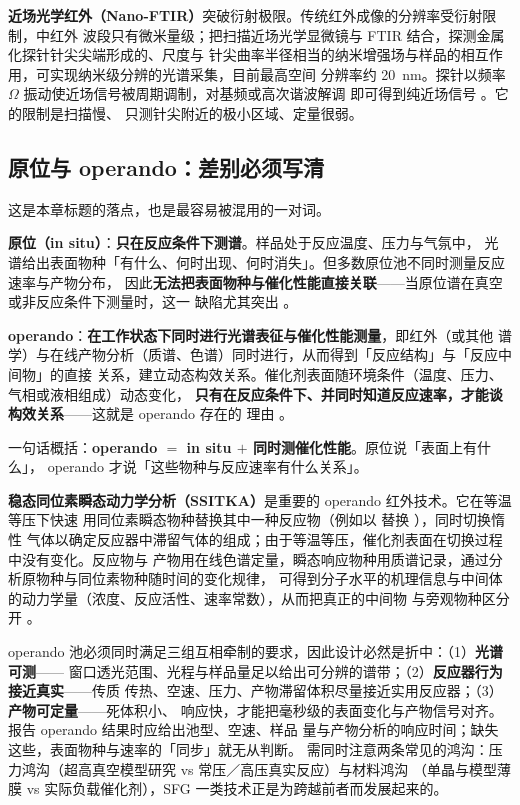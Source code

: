 \textbf{近场光学红外（Nano-FTIR）}突破衍射极限。传统红外成像的分辨率受衍射限制，中红外
波段只有微米量级；把扫描近场光学显微镜与 FTIR 结合，探测金属化探针针尖尖端形成的、尺度与
针尖曲率半径相当的纳米增强场与样品的相互作用，可实现纳米级分辨的光谱采集，目前最高空间
分辨率约 \qty{20}{nm}。探针以频率 $\Omega$ 振动使近场信号被周期调制，对基频或高次谐波解调
即可得到纯近场信号 。它的限制是扫描慢、
只测针尖附近的极小区域、定量很弱。

\subsection{原位与 operando：差别必须写清}

这是本章标题的落点，也是最容易被混用的一对词。

\begin{principle}
\textbf{原位（in situ）}：\textbf{只在反应条件下测谱}。样品处于反应温度、压力与气氛中，
光谱给出表面物种「有什么、何时出现、何时消失」。但多数原位池不同时测量反应速率与产物分布，
因此\textbf{无法把表面物种与催化性能直接关联}——当原位谱在真空或非反应条件下测量时，这一
缺陷尤其突出 。

\textbf{operando}：\textbf{在工作状态下同时进行光谱表征与催化性能测量}，即红外（或其他
谱学）与在线产物分析（质谱、色谱）同时进行，从而得到「反应结构」与「反应中间物」的直接
关系，建立动态构效关系。催化剂表面随环境条件（温度、压力、气相或液相组成）动态变化，
\textbf{只有在反应条件下、并同时知道反应速率，才能谈构效关系}——这就是 operando 存在的
理由 。
\end{principle}

一句话概括：\textbf{operando $=$ in situ $+$ 同时测催化性能}。原位说「表面上有什么」，
operando 才说「这些物种与反应速率有什么关系」。

\textbf{稳态同位素瞬态动力学分析（SSITKA）}是重要的 operando 红外技术。它在等温等压下快速
用同位素瞬态物种替换其中一种反应物（例如以  替换 ），同时切换惰性
气体以确定反应器中滞留气体的组成；由于等温等压，催化剂表面在切换过程中没有变化。反应物与
产物用在线色谱定量，瞬态响应物种用质谱记录，通过分析原物种与同位素物种随时间的变化规律，
可得到分子水平的机理信息与中间体的动力学量（浓度、反应活性、速率常数），从而把真正的中间物
与旁观物种区分开 。

\begin{keycond}
operando 池必须同时满足三组互相牵制的要求，因此设计必然是折中：（1）\textbf{光谱可测}——
窗口透光范围、光程与样品量足以给出可分辨的谱带；（2）\textbf{反应器行为接近真实}——传质
传热、空速、压力、产物滞留体积尽量接近实用反应器；（3）\textbf{产物可定量}——死体积小、
响应快，才能把毫秒级的表面变化与产物信号对齐。报告 operando 结果时应给出池型、空速、样品
量与产物分析的响应时间；缺失这些，表面物种与速率的「同步」就无从判断。
需同时注意两条常见的鸿沟：压力鸿沟（超高真空模型研究 vs 常压／高压真实反应）与材料鸿沟
（单晶与模型薄膜 vs 实际负载催化剂），SFG 一类技术正是为跨越前者而发展起来的。
\end{keycond}

